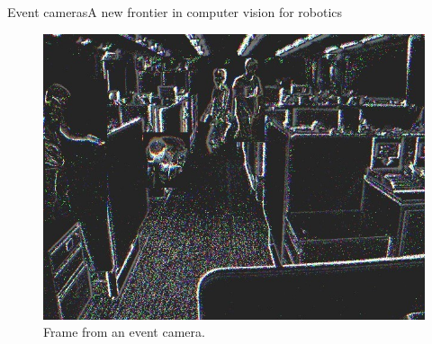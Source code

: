 \begin{frame}{Event cameras}{A new frontier in computer vision for robotics}
	\begin{figure}
		\centering
		\includegraphics[width=.51\textwidth]{event_camera_frame.jpg}
		\caption{Frame from an event camera.}
		\label{fig:eventcameraframe}
	\end{figure}
\end{frame}

